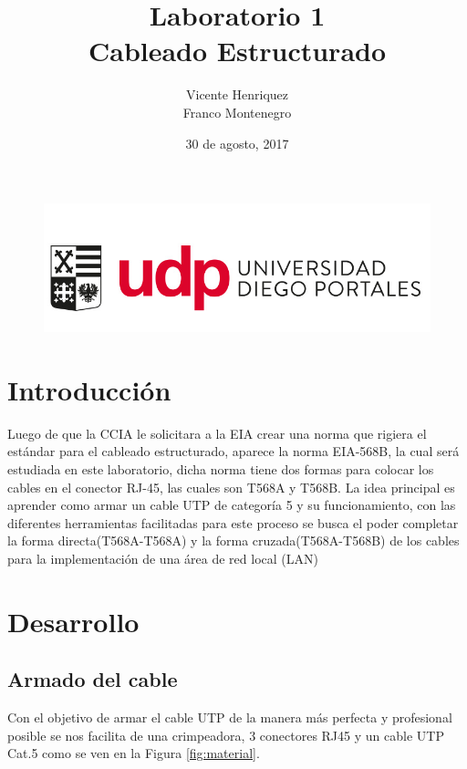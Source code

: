 \documentclass{article}
\begin{document}
\begin{figure}[t!]
\includegraphics[scale=0.3]{logo_udp.PNG}
\label{fig:udplogo}
\end{figure}

\title{\textbf{{Laboratorio 1 \\ Cableado Estructurado \vspace{10cm}}}}
\author{\hspace{8cm} Vicente Henriquez \\ \hspace{8cm} Franco Montenegro}
\date{\hspace{8cm} 30 de agosto, 2017}
\maketitle

\newpage
\tableofcontents

\newpage
\section{Introducción\vspace{0.5cm}}
Luego de que la CCIA le solicitara a la EIA crear una norma que rigiera el estándar para el cableado estructurado, aparece la norma EIA-568B, la cual será estudiada en este laboratorio, dicha norma tiene dos formas para colocar los cables en el conector RJ-45, las cuales son T568A y T568B.
La idea principal es aprender como armar un cable UTP de categoría 5 y su funcionamiento, con las diferentes herramientas facilitadas para este proceso se busca el poder completar la forma directa(T568A-T568A) y la forma cruzada(T568A-T568B) de los cables para la implementación de una área de red local (LAN)
\newpage
\section{Desarrollo \vspace{0.5cm}}
\subsection{Armado del cable\vspace{0.3cm}}
Con el objetivo de armar el cable UTP de la manera más perfecta y profesional posible se nos facilita de una crimpeadora, 3 conectores RJ45 y un cable UTP Cat.5 como se ven en la Figura \ref{fig:material}.
\end{document}
